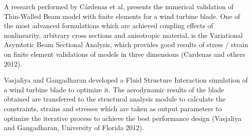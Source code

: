 A research performed by Cárdenas et al, presents the numerical validation of Thin-Walled Beam model with finite elements for a wind turbine blade. One of the most advanced formulations which are achieved coupling effects of nonlinearity, arbitrary cross sections and anisotropic material, is the Variational Asymtotic Beam Sectional Analysis, which provides good results of stress / strain on finite element validations of models in three dimensions (Cardenas and others 2012).

Vasjaliya and Gangadharan developed a Fluid Structure Interaction simulation of a wind turbine blade to optimize it. The aerodynamic results of the blade obtained are transferred to the structural analysis module to calculate the constraints, strains and stresses which are taken as output parameters to optimize the iterative process to achieve the best performance design (Vasjaliya and Gangadharan, University of Florida 2012).

%
%



